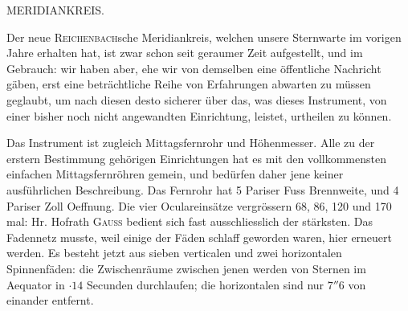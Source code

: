 \par{}\bigskip
\hypertarget{native-434-part-lower}{}
\begin{center}
{\Large MERIDIANKREIS.}
\end{center}

Der neue \textsc{Reichenbach}sche Meridiankreis, welchen unsere Sternwarte im vorigen Jahre erhalten
hat, ist zwar schon seit geraumer Zeit aufgestellt, und im Gebrauch: wir haben aber, ehe wir von
demselben eine öffentliche Nachricht gäben, erst eine beträchtliche Reihe von Erfahrungen abwarten
zu müssen geglaubt, um nach diesen desto sicherer über das, was dieses Instrument, von einer bisher
noch nicht angewandten Einrichtung, leistet, urtheilen zu können.

Das Instrument ist zugleich Mittagsfernrohr und Höhenmesser. Alle zu der erstern Bestimmung
gehörigen Einrichtungen hat es mit den vollkommensten einfachen Mittagsfernröhren gemein, und
bedürfen daher jene keiner ausführlichen Beschreibung. Das Fernrohr hat 5 Pariser Fuss Brennweite,
und 4 Pariser Zoll Oeffnung. Die vier Oculareinsätze vergrössern 68, 86, 120 und 170 mal: Hr.
Hofrath \textsc{Gauss} bedient sich fast ausschliesslich der stärksten. Das Fadennetz musste, weil
einige der Fäden schlaff geworden waren, hier erneuert werden. Es besteht jetzt aus sieben
verticalen und zwei horizontalen Spinnenfäden: die Zwischenräume zwischen jenen werden von Sternen
im Aequator in $\cdot 14$ Secunden durchlaufen; die horizontalen sind nur $7''6$ von einander
entfernt.

